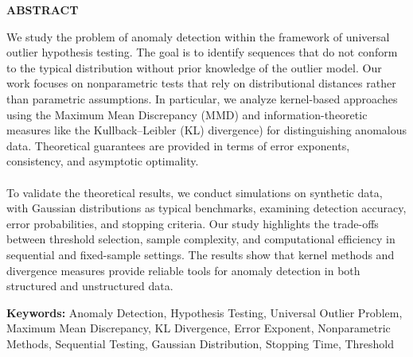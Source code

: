 \thispagestyle{plain}
\setlength{\topmargin}{0.25in}
\begin{center}
    \Large \textbf{\uppercase{Abstract}}
\end{center}

\vspace{3\baselineskip}

\noindent
We study the problem of anomaly detection within the framework of universal outlier hypothesis testing. The goal is to identify sequences 
that do not conform to the typical distribution without prior knowledge of the 
outlier model. Our work focuses on nonparametric tests that rely on 
distributional distances rather than parametric assumptions. In particular, we 
analyze kernel-based approaches using the Maximum Mean Discrepancy (MMD)
and information-theoretic measures like the Kullback--Leibler (KL) divergence) 
for distinguishing anomalous data. Theoretical guarantees are provided in terms of error exponents, consistency, and asymptotic optimality.  
\\
\\
To validate the theoretical results, we conduct simulations on synthetic data, with Gaussian distributions as typical benchmarks, examining detection accuracy, 
error probabilities, and stopping criteria. Our study highlights the trade-offs between threshold selection, sample complexity, and computational efficiency in sequential and fixed-sample settings. The results show that kernel methods and 
divergence measures provide reliable tools for anomaly detection in both structured and unstructured data.  

\vspace{\baselineskip}

\noindent
\textbf{Keywords:} Anomaly Detection, Hypothesis Testing, Universal Outlier Problem, Maximum Mean Discrepancy, KL Divergence, Error Exponent, Nonparametric Methods, Sequential Testing, Gaussian Distribution, Stopping Time, Threshold